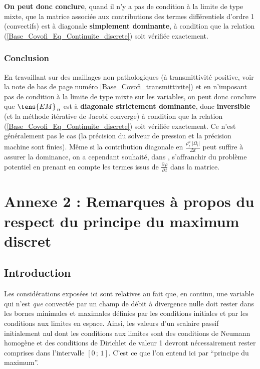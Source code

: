 {\bf On peut donc conclure}, quand il n'y a pas de condition \`a la limite de type mixte,
que la matrice associ\'ee aux contributions
 des termes
diff\'erentiels d'ordre 1 (convectifs) est \`a diagonale {\bf simplement
dominante}, \`a condition que la relation (\ref{Base_Covofi_Eq_Continuite_discrete}) soit
v\'erifi\'ee exactement.


\subsubsection*{Conclusion}
En travaillant sur
des maillages non pathologiques (\`a transmittivit\'e positive, voir la note de
bas de page num\'ero \ref{Base_Covofi_transmittivite}) et en n'imposant pas de condition \`a la limite
de type mixte sur les variables, on peut donc conclure que
$\tens{EM}_{\,n}$
est \`a {\bf diagonale strictement dominante}, donc {\bf inversible} (et la
m\'ethode it\'erative de Jacobi converge) \`a condition que la relation
(\ref{Base_Covofi_Eq_Continuite_discrete}) soit
v\'erifi\'ee exactement. Ce n'est g\'en\'eralement pas le cas (la pr\'ecision du
solveur de pression et la pr\'ecision machine sont finies). M\^eme si
la contribution diagonale en
$\displaystyle \frac {\rho_I^n\ |\Omega_i|}{\Delta t}$ peut suffire \`a
assurer la dominance, on a cependant souhait\'e, dans \CS, s'affranchir du
probl\`eme potentiel en prenant en compte les termes issus de $\displaystyle \frac
{{\partial}\,\rho}{{\partial}\,t}$ dans la matrice.

\newpage
\section*{Annexe 2 : Remarques \`a propos du respect du principe du maximum discret}
\subsection*{Introduction}
%
Les consid\'erations expos\'ees ici sont relatives au fait que, en continu,
une variable qui n'est {\em que} convect\'ee par un champ de d\'ebit \`a
divergence nulle doit rester dans les bornes minimales et maximales d\'efinies
par les conditions initiales et par les conditions aux limites en espace. Ainsi,
les valeurs d'un scalaire passif initialement nul
dont les conditions aux limites sont des conditions de Neumann homog\`ene
et des conditions de Dirichlet de valeur 1 devront n\'ecessairement rester
comprises dans l'intervalle $[0\,;\,1]$. C'est ce que l'on entend ici par
``principe du maximum''.

